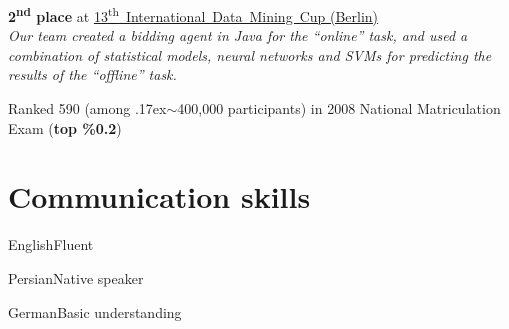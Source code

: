\documentclass{tccv}
\renewcommand{\tilde}{\raise.17ex\hbox{$\scriptstyle\sim$}}
\begin{document}
\begin{list}{}{\leftmargin=1em}

\item
{\bf 2\textsuperscript{nd} place} at \href{http://www.data-mining-cup.de/en/review/dmc-2012/}{\mbox{13\textsuperscript{th} International Data Mining Cup} (Berlin)}
\\
{\it Our team created a bidding agent in Java for the \mbox{``online''} task, and used a combination of statistical models, \mbox{neural} networks and SVMs for predicting the results of the ``offline'' task.}



\item
Ranked 590 (among \tilde400,000 participants) in 2008 \mbox{National} Matriculation Exam ({\bf top \%0.2})


\end{list}











\section{Communication skills}


\begin{factlist}

\item{English}{Fluent}

\item{Persian}{Native speaker}

\item{German}{Basic understanding}

\end{factlist}


\vspace{-4pt}

\sectionline

\vspace{-10pt}
\end{document}
